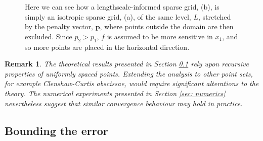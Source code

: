 \documentclass[pdflatex,sn-mathphys-num]{sn-jnl}%
\theoremstyle{thmstyleone}%
\theoremstyle{thmstyletwo}%
\newtheorem{remark}{Remark}%
\theoremstyle{thmstylethree}%
\begin{document}
\begin{figure}[h]

    \caption{Here we can see how a lengthscale-informed sparse grid, (b), is simply an isotropic sparse grid, (a), of the same level, \(L\), stretched by the penalty vector, \(\mathbf{p}\), where points outside the domain are then excluded. Since \(p_2>p_1\), \(f\) is assumed to be more sensitive in \(x_1\), and so more points are placed in the horizontal direction.}
    \label{fig: stretched sparse grid}
\end{figure}
\begin{remark}
    The theoretical results presented in Section \ref{subsec: results} rely upon recursive properties of uniformly spaced points. Extending the analysis to other point sets, for example Clenshaw-Curtis abscissae, would require significant alterations to the theory. The numerical experiments presented in Section \ref{sec: numerics} nevertheless suggest that similar convergence behaviour may hold in practice.
\end{remark}
\subsection{Bounding the error}\label{subsec: results}
\end{document}
